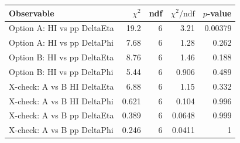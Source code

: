 \begin{tabular}{|l|r|r|r|r|}
\hline
Observable & $\chi^2$ & ndf & $\chi^2/\mathrm{ndf}$ & $p$-value \\
\hline
Option A: HI vs pp DeltaEta & 19.2 & 6 & 3.21 & 0.00379 \\
Option A: HI vs pp DeltaPhi & 7.68 & 6 & 1.28 & 0.262 \\
Option B: HI vs pp DeltaEta & 8.76 & 6 & 1.46 & 0.188 \\
Option B: HI vs pp DeltaPhi & 5.44 & 6 & 0.906 & 0.489 \\
X-check: A vs B HI DeltaEta & 6.88 & 6 & 1.15 & 0.332 \\
X-check: A vs B HI DeltaPhi & 0.621 & 6 & 0.104 & 0.996 \\
X-check: A vs B pp DeltaEta & 0.389 & 6 & 0.0648 & 0.999 \\
X-check: A vs B pp DeltaPhi & 0.246 & 6 & 0.0411 & 1 \\
\hline
\end{tabular}
